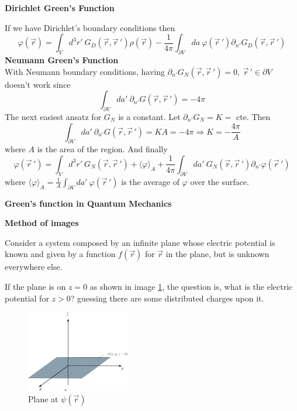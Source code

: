 \documentclass[12pt,a4paper]{article}
\newcommand{\integral}[3]{\int_{#1}^{#2} d #3 \ } %
\begin{document}
\textbf{Dirichlet Green's Function}

If we have Dirichlet's boundary conditions then 
\begin{equation}
	\label{PotentialfromDirichletfunction}
	\varphi(\vec{r}) = \integral{V}{}{^3r'}G_D(\vec{r},\vec{r}\,') \rho(\vec{r}) -\frac{1}{4\pi} \integral{\partial V}{}{a}  \varphi(\vec{r}\,')\partial_{n'}G_D(\vec{r},\vec{r}\,')
\end{equation}
\textbf{Neumann Green's Function}\\
With Neumann boundary conditions, having $\partial_{n'} G_N(\vec{r},\vec{r}\,') = 0,\ \vec{r}\,'\in \partial V$ doesn't work since
\begin{equation}
	\integral{\partial V}{}{a'} \partial_{n'}G(\vec{r},\vec{r}\,') = -4\pi
\end{equation}
The next easiest ansatz for $G_N$ is a constant. Let $\partial_{n'} G_N = K = $ cte. Then
\begin{equation}
	\integral{\partial V}{}{a'} \partial_{n'}G(\vec{r},\vec{r}\,') = KA = -4\pi \Rightarrow K = -\frac{4\pi}{A}
\end{equation}
where $A$ is the area of the region. And finally
\begin{equation}
	\varphi(\vec{r}\,') = \integral{V}{}{^3r'} G_N(\vec{r},\vec{r}\,') + \langle \varphi \rangle_A + \frac{1}{4\pi}\integral{\partial V}{}{a'} G_N(\vec{r},\vec{r}\,') \partial_{n'} \varphi(\vec{r}\,')
\end{equation}
where $\langle \varphi \rangle_A = \frac{1}{A}\integral{\partial V}{}{a'} \varphi(\vec{r}\,')$ is the average of $\varphi$ over the surface.

\textbf{Green's function in Quantum Mechanics}

\textbf{Method of images}

Consider a system composed by an infinite plane whose electric potential is known and given by a function $f(\vec{r})$ for $\vec{r}$ in the plane, but is unknown everywhere else.

If the plane is on $z=0$ as shown in image \ref{planeforimagemethod}, the question is, what is the electric potential for $z>0$? guessing there are some distributed charges upon it.

\begin{figure}
	\centering
	\includegraphics[width=0.4\textwidth]{figs/planeforimagemethod.png}
	\caption{Plane at $\psi(\vec{r})$}
	\label{planeforimagemethod}
\end{figure}
\end{document}
